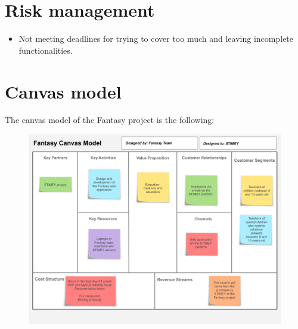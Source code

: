 \section{Risk management}
\begin{itemize}
	\item Not meeting deadlines for trying to cover too much and leaving incomplete functionalities.
\end{itemize}

\section{Canvas model}
The canvas model of the Fantasy project is the following:
\begin{figure}[h]
	\centering
	\includegraphics[scale=0.5]{Prolegomenon/Canvas.png}
\end{figure}